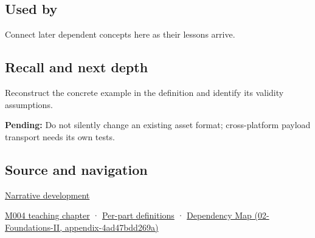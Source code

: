 \subsection{Used by}\label{used-by}

Connect later dependent concepts here as their lessons arrive.

\subsection{Recall and next depth}\label{recall-and-next-depth}

Reconstruct the concrete example in the definition and identify its validity assumptions.

\textbf{Pending:} Do not silently change an existing asset format; cross-platform payload transport needs its own tests.

\subsection{Source and navigation}\label{source-and-navigation}

\href{Continuous\%20Notes/Computing\%20Foundations\%20-\%20From\%20Bits\%20to\%20C++\%20and\%20Systems\%20APIs\#Choosing\%20what\%20information\%20to\%20keep}{Narrative development}

\href{Continuous\%20Notes/Computing\%20Foundations\%20-\%20From\%20Bits\%20to\%20C++\%20and\%20Systems\%20APIs\#A\%20stretching\%20ruler\%20for\%20real-valued\%20quantities}{M004 teaching chapter} · \hyperref[appendix-fd090d982a15]{Per-part definitions} · \href{}{Dependency Map (02-Foundations-II, appendix-4ad47bdd269a)}
